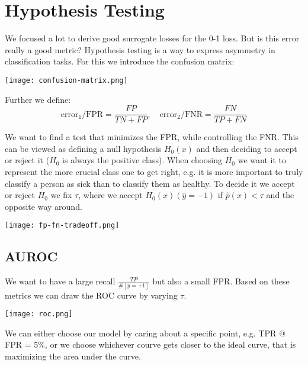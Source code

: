 \section{Hypothesis Testing}

We focused a lot to derive good surrogate losses for the 0-1 loss. But is this error really a good metric? Hypothesis testing is a way to express asymmetry in classification tasks. For this we introduce the confusion matrix:

\begin{center}
	\texttt{[image: confusion-matrix.png]}
\end{center}

Further we define:
$$\text{error}_1 / \text{FPR} = \frac{FP}{TN + FP}, \quad \text{error}_2 / \text{FNR} = \frac{FN}{TP + FN}$$

We want to find a test that minimizes the FPR, while controlling the FNR. This can be viewed as defining a null hypothesis $H_0(x)$ and then deciding to accept or reject it ($H_0$ is always the positive class). When choosing $H_0$ we want it to represent the more crucial class one to get right, e.g. it is more important to truly classify a person as sick than to classify them as healthy. To decide it we accept or reject $H_0$ we fix $\tau$, where we accept $H_0(x) (\hat{y} = -1)$ if $\hat{p}(x) < \tau$ and the opposite way around.

\texttt{[image: fp-fn-tradeoff.png]}

\subsection{AUROC}

We want to have a large recall $\frac{TP}{\#[y = +1]}$ but also a small FPR. Based on these metrics we can draw the ROC curve by varying $\tau$.

\texttt{[image: roc.png]}

We can either choose our model by caring about a specific point, e.g. TPR $@$ FPR = 5\%, or we choose whichever courve gets closer to the ideal curve, that is maximizing the area under the curve.